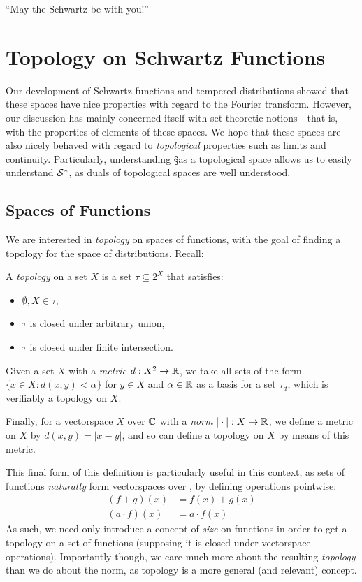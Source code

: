 
  \begin{savequote}
    ``May the Schwartz be with you!''
  \end{savequote}
  \chapter{Topology on Schwartz Functions}
    \label{ch:topons}
    Our development of Schwartz functions and tempered distributions showed that these spaces have nice properties with regard to the Fourier transform.
    However, our discussion has mainly concerned itself with set-theoretic notions---that is, with the properties of elements of these spaces.
    We hope that these spaces are also nicely behaved with regard to \emph{topological} properties such as limits and continuity.
    Particularly, understanding \S as a topological space allows us to easily understand $\S^*$, as duals of topological spaces are well understood.

    \section{Spaces of Functions}
      We are interested in \emph{topology} on spaces of functions, with the goal of finding a topology for the space of distributions.
      Recall:
      \begin{defn}
        A \emph{topology} on a set $X$ is a set $\tau\subseteq2^X$ that satisfies:
        \begin{itemize}
          \item $\emptyset,X\in\tau$,
          \item $\tau$ is closed under arbitrary union,
          \item $\tau$ is closed under finite intersection.
        \end{itemize}

      Given a set $X$ with a \emph{metric} $d:X^2\rightarrow\R$, we take all sets of the form $\{x\in X:d(x,y)<\alpha\}$ for $y\in X$ and $\alpha\in\R$ as a basis for a set $\tau_d$, which is verifiably a topology on $X$.

      Finally, for a vectorspace $X$ over $\C$ with a \emph{norm} $|\cdot|:X\rightarrow\R$, we define a metric on $X$ by $d(x,y)=|x-y|$, and so can define a topology on $X$ by means of this metric.
      \end{defn}

      This final form of this definition is particularly useful in this context, as sets of functions \emph{naturally} form vectorspaces over \C, by defining operations pointwise:
      \begin{align*}
        (f+g)(x) &= f(x)+g(x)\\
        (a\cdot f)(x) &= a\cdot f(x)
      \end{align*}
      As such, we need only introduce a concept of \emph{size} on functions in order to get a topology on a set of functions (supposing it is closed under vectorspace operations).
      Importantly though, we care much more about the resulting \emph{topology} than we do about the norm, as topology is a more general (and relevant) concept.

